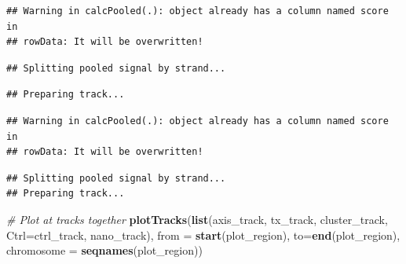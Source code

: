 \documentclass[9pt,a4paper,]{extarticle}
\newenvironment{Shaded}{\begin{snugshade}}{\end{snugshade}}
\newcommand{\KeywordTok}[1]{\textcolor[rgb]{0.13,0.29,0.53}{\textbf{{#1}}}}
\newcommand{\DataTypeTok}[1]{\textcolor[rgb]{0.13,0.29,0.53}{{#1}}}
\newcommand{\StringTok}[1]{\textcolor[rgb]{0.31,0.60,0.02}{{#1}}}
\newcommand{\CommentTok}[1]{\textcolor[rgb]{0.56,0.35,0.01}{\textit{{#1}}}}
\newcommand{\NormalTok}[1]{{#1}}
\begin{document}
\begin{verbatim}
## Warning in calcPooled(.): object already has a column named score in
## rowData: It will be overwritten!
\end{verbatim}

\begin{verbatim}
## Splitting pooled signal by strand...
\end{verbatim}

\begin{verbatim}
## Preparing track...
\end{verbatim}

\begin{Shaded}
\end{Shaded}

\begin{verbatim}
## Warning in calcPooled(.): object already has a column named score in
## rowData: It will be overwritten!
\end{verbatim}

\begin{verbatim}
## Splitting pooled signal by strand...
## Preparing track...
\end{verbatim}

\begin{Shaded}
\begin{Highlighting}[]
\CommentTok{# Plot at tracks together}
\KeywordTok{plotTracks}\NormalTok{(}\KeywordTok{list}\NormalTok{(axis_track, }
                \NormalTok{tx_track, }
                \NormalTok{cluster_track, }
                \DataTypeTok{Ctrl=}\NormalTok{ctrl_track, }
                \NormalTok{nano_track),}
           \DataTypeTok{from =} \KeywordTok{start}\NormalTok{(plot_region), }
           \DataTypeTok{to=}\KeywordTok{end}\NormalTok{(plot_region), }
           \DataTypeTok{chromosome =} \KeywordTok{seqnames}\NormalTok{(plot_region))}
\end{Highlighting}
\end{Shaded}
\end{document}
